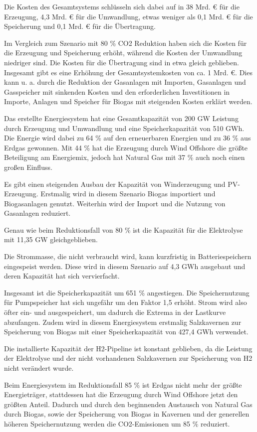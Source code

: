 Die Kosten des Gesamtsystems schlüsseln sich dabei auf in 38 Mrd. € für die Erzeugung, 4,3 Mrd. € für die Umwandlung, etwas weniger als 0,1 Mrd. € für die Speicherung und 0,1 Mrd. € für die Übertragung.

Im Vergleich zum Szenario mit 80 \% CO2 Reduktion haben sich die Kosten für die Erzeugung und Speicherung erhöht, während die Kosten der Umwandlung niedriger sind. Die Kosten für die Übertragung sind in etwa gleich geblieben. 
Insgesamt gibt es eine Erhöhung der Gesamtsystemkosten von ca. 1 Mrd. €. Dies kann u. a. durch die Reduktion der Gasanlagen mit Importen, Gasanlagen und Gasspeicher mit sinkenden Kosten und den erforderlichen Investitionen in Importe, Anlagen und Speicher für Biogas mit steigenden Kosten erklärt werden.

Das erstellte Energiesystem hat eine Gesamtkapazität von 200 GW Leistung durch Erzeugung und Umwandlung und eine Speicherkapazität von 510 GWh. Die Energie wird dabei zu 64 \% auf den erneuerbaren Energien und zu 36 \% aus Erdgas gewonnen. Mit 44 \% hat die Erzeugung durch Wind Offshore die größte Beteiligung am Energiemix, jedoch hat Natural Gas mit 37 \% auch noch einen großen Einfluss.

Es gibt einen steigenden Ausbau der Kapazität von Winderzeugung und PV-Erzeugung. Erstmalig wird in diesem Szenario Biogas importiert und Biogasanlagen genutzt. Weiterhin wird der Import und die Nutzung von Gasanlagen reduziert.

Genau wie beim Reduktionsfall von 80 \% ist die Kapazität für die Elektrolyse mit 11,35 GW gleichgeblieben.

Die Strommasse, die nicht verbraucht wird, kann kurzfristig in Batteriespeichern eingespeist werden. Diese wird in diesem Szenario auf 4,3 GWh ausgebaut und deren Kapazität hat sich vervierfacht.

Insgesamt ist die Speicherkapazität um 651 \% angestiegen. Die Speichernutzung für Pumpspeicher hat sich ungefähr um den Faktor 1,5 erhöht. Strom wird also öfter ein- und ausgespeichert, um dadurch die Extrema in der Lastkurve abzufangen. Zudem wird in diesem Energiesystem erstmalig Salzkavernen zur Speicherung von Biogas mit einer Speicherkapazität von 427,4 GWh verwendet.

Die installierte Kapazität der H2-Pipeline ist konstant geblieben, da die Leistung der Elektrolyse und der nicht vorhandenen Salzkavernen zur Speicherung von H2 nicht verändert wurde.

Beim Energiesystem im Reduktionsfall 85 \% ist Erdgas nicht mehr der größte Energieträger, stattdessen hat die Erzeugung durch Wind Offshore jetzt den größten Anteil.
Dadurch und durch den beginnenden Austausch von Natural Gas durch Biogas, sowie der Speicherung von Biogas in Kavernen und der generellen höheren Speichernutzung werden die CO2-Emissionen um 85 \% reduziert.

